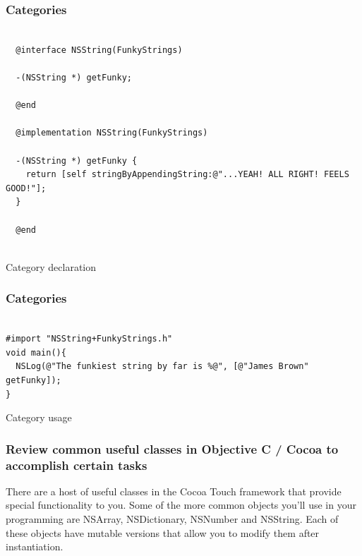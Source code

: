 \documentclass[10pt]{beamer}
\begin{document}
\begin{frame}[fragile]
  \frametitle{Categories}
  \begin{listing}[H]
    \begin{verbatim}
  
  @interface NSString(FunkyStrings)
  
  -(NSString *) getFunky;
  
  @end
  
  @implementation NSString(FunkyStrings)
  
  -(NSString *) getFunky {
    return [self stringByAppendingString:@"...YEAH! ALL RIGHT! FEELS GOOD!"];
  }
  
  @end
              
  \end{verbatim}
    \caption{Category declaration}
    \label{listing:18}
  \end{listing}

\end{frame}

\begin{frame}[fragile]
  \frametitle{Categories}
  \begin{listing}[H]
  \begin{verbatim}

#import "NSString+FunkyStrings.h"
void main(){
  NSLog(@"The funkiest string by far is %@", [@"James Brown" getFunky]);
}
\end{verbatim}
  \caption{Category usage}
  \label{listing:19}
\end{listing}

\end{frame}

    
\begin{frame}[fragile]
  \frametitle{Review common useful classes in Objective C / Cocoa to accomplish certain tasks}
  There are a host of useful classes in the Cocoa Touch framework that provide special functionality to you.  Some of the more common objects you'll use in your programming are NSArray, NSDictionary, NSNumber and NSString.  Each of these objects have mutable versions that allow you to modify them after instantiation.

\end{frame}
\end{document}
